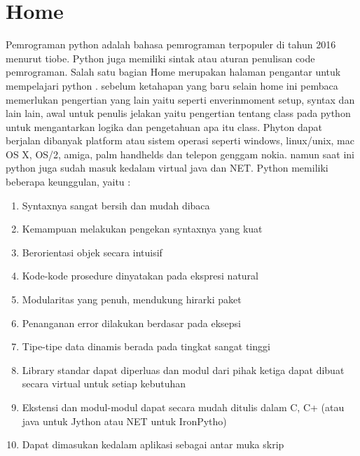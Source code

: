\section{Home}
Pemrograman python adalah bahasa pemrograman terpopuler di tahun 2016 menurut tiobe. Python juga memiliki sintak atau aturan penulisan code pemrograman. Salah satu bagian Home merupakan halaman pengantar untuk mempelajari python . sebelum ketahapan yang baru selain home ini pembaca memerlukan pengertian yang lain yaitu seperti enverinmoment setup, syntax dan lain lain, awal untuk penulis jelakan yaitu pengertian tentang class pada python untuk mengantarkan logika dan pengetahuan apa itu class.
Phyton dapat berjalan dibanyak platform atau sistem operasi seperti windows, linux/unix, mac OS X, OS/2, amiga, palm handhelds dan telepon genggam nokia. namun saat ini python juga sudah masuk kedalam virtual java dan NET. Python memiliki beberapa keunggulan, yaitu :
\begin{enumerate}
\item Syntaxnya sangat bersih dan mudah dibaca
\item Kemampuan melakukan pengekan syntaxnya yang kuat
\item Berorientasi objek secara intuisif
\item Kode-kode prosedure dinyatakan pada ekspresi natural
\item Modularitas yang penuh, mendukung hirarki paket
\item Penanganan error dilakukan berdasar pada eksepsi
\item Tipe-tipe data dinamis berada pada tingkat sangat tinggi
\item Library standar dapat diperluas dan modul dari pihak ketiga dapat dibuat secara virtual untuk setiap kebutuhan
\item Ekstensi dan modul-modul dapat secara mudah ditulis dalam C, C+ (atau java untuk Jython atau NET untuk IronPytho)
\item Dapat dimasukan kedalam aplikasi sebagai antar muka skrip
\end{enumerate}

